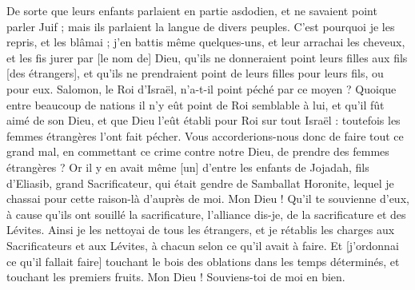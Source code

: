 \begin{multicols}{2}
De sorte que leurs enfants parlaient en partie asdodien, et ne savaient point parler Juif ; mais ils parlaient la langue de divers peuples.
C'est pourquoi je les repris, et les blâmai ; j'en battis même quelques-uns, et leur arrachai les cheveux, et les fis jurer par [le nom de] Dieu, qu'ils ne donneraient point leurs filles aux fils [des étrangers], et qu'ils ne prendraient point de leurs filles pour leurs fils, ou pour eux.
Salomon, le Roi d'Israël, n'a-t-il point péché par ce moyen ? Quoique entre beaucoup de nations il n'y eût point de Roi semblable à lui, et qu'il fût aimé de son Dieu, et que Dieu l'eût établi pour Roi sur tout Israël : toutefois les femmes étrangères l'ont fait pécher.
Vous accorderions-nous donc de faire tout ce grand mal, en commettant ce crime contre notre Dieu, de prendre des femmes étrangères ?
Or il y en avait même [un] d'entre les enfants de Jojadah, fils d'Eliasib, grand Sacrificateur, qui était gendre de Samballat Horonite, lequel je chassai pour cette raison-là d'auprès de moi.
Mon Dieu ! Qu'il te souvienne d'eux, à cause qu'ils ont souillé la sacrificature, l'alliance dis-je, de la sacrificature et des Lévites.
Ainsi je les nettoyai de tous les étrangers, et je rétablis les charges aux Sacrificateurs et aux Lévites, à chacun selon ce qu'il avait à faire.
Et [j'ordonnai ce qu'il fallait faire] touchant le bois des oblations dans les temps déterminés, et touchant les premiers fruits. Mon Dieu ! Souviens-toi de moi en bien.
\PPE{}
\end{multicols}
